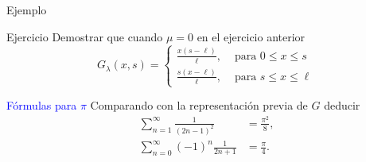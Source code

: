 \documentclass[xcolor=dvipsnames,a4paper,10pt,handout]{beamer}
\renewcommand{\emph}[1]{\textcolor{blue}{#1}}
\begin{document}
\begin{frame}{Ejemplo}

\begin{block}{Ejercicio} Demostrar que cuando $\mu=0$ en el ejercicio anterior
$$
G_\lambda(x, s)= \begin{cases}\frac{x(s-\ell)}{\ell}, & \text { para } 0 \leq x \leq s \\ \frac{s(x-\ell)}{\ell}, & \text { para } s \leq x \leq \ell\end{cases}
$$

\emph{Fórmulas para $\pi$} Comparando con la representación previa de $G$ deducir 
\[
\begin{split}
 \sum_{n=1}^\infty\frac{1}{(2n-1)^2}&=\frac{\pi^2}{8},\\
  \sum_{n=0}^\infty(-1)^n\frac{1}{2n+1}&=\frac{\pi}{4}.
\end{split}
\]

\end{block}






\end{frame}
\end{document}
